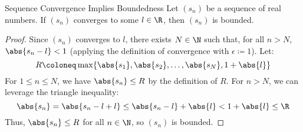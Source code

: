 \begin{thmbox}{Sequence Convergence Implies Boundedness}{}
    Let $(s_n)$ be a sequence of real numbers. If $(s_n)$ converges to some $l \in \R$, then $(s_n)$ is bounded.
    \tcblower
    \begin{proof}
        Since $(s_n)$ converges to $l$, there exists $N \in \N$ such that, for all $n > N$, $\abs{s_n - l} < 1$ (applying the definition of convergence with $\epsilon \coloneq 1$). Let:
        \[ R \coloneq \max\{ \abs{s_1}, \abs{s_2}, \ldots, \abs{s_N}, 1 + \abs{l} \} \]
        For $1 \leq n \leq N$, we have $\abs{s_n} \leq R$ by the definition of $R$. For $n > N$, we can leverage the triangle inequality:
        \[ \abs{s_n} = \abs{s_n - l + l} \leq \abs{s_n - l} + \abs{l} < 1 + \abs{l} \leq \R \]
        Thus, $\abs{s_n} \leq R$ for all $n \in \N$, so $(s_n)$ is bounded.
    \end{proof}
\end{thmbox}



